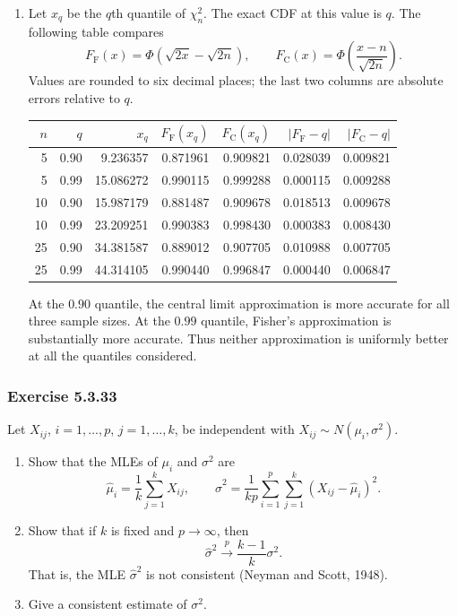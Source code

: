 \documentclass[lang=en,11pt,a4paper,citestyle=authoryear]{elegantpaper}
\begin{document}
\begin{enumerate}[label=(\alph*),leftmargin=*]
\item Let $x_q$ be the $q$th quantile of $\chi_n^2$.
The exact CDF at this value is $q$. The following table compares
\[
F_{\mathrm F}(x)=\Phi(\sqrt{2x}-\sqrt{2n}),\qquad
F_{\mathrm C}(x)=\Phi\left(\frac{x-n}{\sqrt{2n}}\right).
\]
Values are rounded to six decimal places; the last two columns are
absolute errors relative to $q$.
\begin{center}
\small
\setlength{\tabcolsep}{4pt}
\begin{tabular}{rrrrrrr}
\hline
$n$ & $q$ & $x_q$ & $F_{\mathrm F}(x_q)$ & $F_{\mathrm C}(x_q)$
& $|F_{\mathrm F}-q|$ & $|F_{\mathrm C}-q|$\\
\hline
5 & 0.90 & 9.236357 & 0.871961 & 0.909821 & 0.028039 & 0.009821\\
5 & 0.99 & 15.086272 & 0.990115 & 0.999288 & 0.000115 & 0.009288\\
10 & 0.90 & 15.987179 & 0.881487 & 0.909678 & 0.018513 & 0.009678\\
10 & 0.99 & 23.209251 & 0.990383 & 0.998430 & 0.000383 & 0.008430\\
25 & 0.90 & 34.381587 & 0.889012 & 0.907705 & 0.010988 & 0.007705\\
25 & 0.99 & 44.314105 & 0.990440 & 0.996847 & 0.000440 & 0.006847\\
\hline
\end{tabular}
\end{center}
At the $0.90$ quantile, the central limit approximation is more
accurate for all three sample sizes. At the $0.99$ quantile,
Fisher's approximation is substantially more accurate.
Thus neither approximation is uniformly better at all the
quantiles considered.
\end{enumerate}
\vspace{2em}

\subsubsection*{Exercise 5.3.33}
Let $X_{ij}$, $i=1,\ldots,p$, $j=1,\ldots,k$, be independent with
$X_{ij}\sim N(\mu_i,\sigma^2)$.
\begin{enumerate}[label=(\alph*),leftmargin=*]
\item Show that the MLEs of $\mu_i$ and $\sigma^2$ are
\[
\widehat\mu_i=\frac1k\sum_{j=1}^kX_{ij},
\qquad
\widehat\sigma^2=\frac1{kp}\sum_{i=1}^p\sum_{j=1}^k
(X_{ij}-\widehat\mu_i)^2.
\]
\item Show that if $k$ is fixed and $p\to\infty$, then
\[
\widehat\sigma^2\xrightarrow{p}\frac{k-1}{k}\sigma^2.
\]
That is, the MLE $\widehat\sigma^2$ is not consistent
(Neyman and Scott, 1948).
\item Give a consistent estimate of $\sigma^2$.
\end{enumerate}
\end{document}
